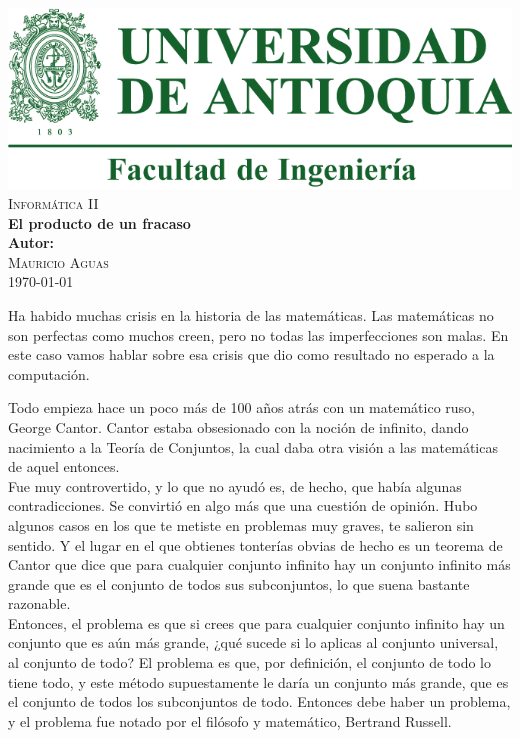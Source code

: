 \documentclass{article}
\begin{document}
\begin{titlepage}


\center %

\includegraphics[scale=0.5]{Udea.png}\\[2cm] 

\textsc{\Large Informática II}\\[2cm] 

{ \huge \bfseries El producto de un fracaso}\\[3cm]

\textbf{Autor:}\\ 
\textsc{Mauricio Aguas}\\[4cm] 


{\large \today}\\[2cm]

\vfill 

\end{titlepage}

\newpage

Ha habido muchas crisis en la historia de las matemáticas. Las matemáticas no son perfectas como muchos creen, pero no todas las imperfecciones son malas. En este caso vamos hablar sobre esa crisis que dio como resultado no esperado a la computación.

\vspace{1mm}

Todo empieza hace un poco más de 100 años atrás con un matemático ruso, George Cantor. Cantor estaba obsesionado con la noción de infinito, dando nacimiento a la Teoría de Conjuntos, la cual daba otra visión a las matemáticas de aquel entonces. \\
Fue muy controvertido, y lo que no ayudó es, de hecho, que había algunas contradicciones. Se convirtió en algo más que una cuestión de opinión. Hubo algunos casos en los que te metiste en problemas muy graves, te salieron sin sentido. Y el lugar en el que obtienes tonterías obvias de hecho es un teorema de Cantor que dice que para cualquier conjunto infinito hay un conjunto infinito más grande que es el conjunto de todos sus subconjuntos, lo que suena bastante razonable. \\ 
Entonces, el problema es que si crees que para cualquier conjunto infinito hay un conjunto que es aún más grande, ¿qué sucede si lo aplicas al conjunto universal, al conjunto de todo? El problema es que, por definición, el conjunto de todo lo tiene todo, y este método supuestamente le daría un conjunto más grande, que es el conjunto de todos los subconjuntos de todo. Entonces debe haber un problema, y el problema fue notado por el filósofo y matemático, Bertrand Russell.
\end{document}
